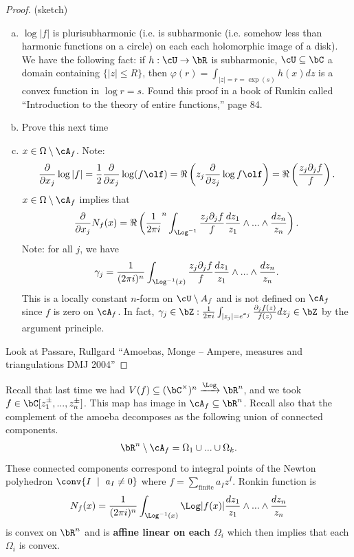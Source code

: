 \begin{proof}
  (sketch)
  \begin{enumerate}[(a)]
    \item $\log|f|$ is plurisubharmonic (i.e. is subharmonic (i.e. somehow less than harmonic functions on a circle) on each each holomorphic image of a disk). We have the following fact: if $h:\cU \to \bR$ is subharmonic, $\cU \subseteq \bC$ a domain containing $\{|z| \leq R\}$, then $\varphi(r) = \int_{|z| = r = \exp (s)} h(x) dz$ is a convex function in $\log r = s$. Found this proof in a book of Runkin called ``Introduction to the theory of entire functions,'' page 84.
    \item Prove this next time
    \item $x \in \Omega \setminus \cA_f$. Note:
      \begin{align*}
        \frac{\partial}{\partial x_j}\log |f| = \frac{1}{2} \frac{\partial}{\partial x_j} \log(f\olf) = \Re\left(z_j \frac{\partial}{\partial z_j} \log f\olf\right) = \Re\left(\frac{z_j\partial_j f}{f}\right).
      \end{align*}
      $x \in \Omega \setminus \cA_f$ implies that
      \begin{align*}
        \frac{\partial}{\partial x_j} N_f(x) = \Re\left(\frac{1}{2\pi i}^n \int_{\Log^{-1}} \frac{z_j\partial_j f}{f}\frac{dz_1}{z_1}\wedge ... \wedge \frac{dz_n}{z_n}\right).
      \end{align*}
      Note: for all $j$, we have
      \begin{align*}
        \gamma_j = \frac{1}{(2\pi i)^n} \int_{\Log^{-1}(x)} \frac{z_j\partial_j f}{f} \frac{dz_1}{z_1}\wedge ...\wedge \frac{dz_n}{z_n}.
      \end{align*}
      This is a locally constant $n$-form on $\cU\setminus A_f$ and is not defined on $\cA_f$ since $f$ is zero on $\cA_f$. In fact, $\gamma_j \in \bZ: \frac{1}{2\pi i} \int_{|z_j| = e^{x_j}} \frac{\partial_j f(z)}{f(z)} dz_j \in \bZ$ by the argument principle.
  \end{enumerate}

  Look at Passare, Rullgard ``Amoebas, Monge -- Ampere, measures and triangulations DMJ 2004''
\end{proof}


Recall that last time we had $V(f) \subseteq (\bC^\times)^n \xrightarrow{\Log} \bR^n$, and we took $f \in \bC[z_1^{\pm},...,z_n^{\pm}]$. This map has image in $\cA_f\subseteq \bR^n$. Recall also that the complement of the amoeba decomposes as the following union of connected components.
\begin{align*}
  \bR^n \setminus \cA_f = \Omega_1 \cup ... \cup \Omega_k.
\end{align*}
These connected components correspond to integral points of the Newton polyhedron $\conv\{I ~\mid~ a_I \neq 0\}$ where $f = \sum_{\text{finite}} a_I z^I$.
Ronkin function is
\begin{align*}
  N_f(x) = \frac{1}{(2\pi i)^n} \int_{\Log^{-1}(x)} \Log|f(x)| \frac{dz_1}{z_1} \wedge ... \wedge \frac{dz_n}{z_n}
\end{align*}
is convex on $\bR^n$ and is \textbf{affine linear on each $\Omega_i$} which then implies that each $\Omega_i$ is convex.

